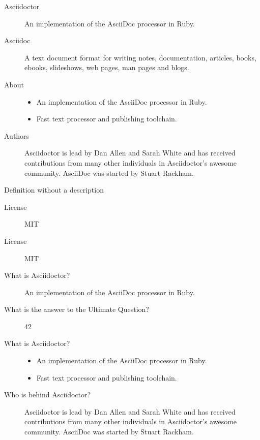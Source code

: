 \begin{description}
\item[Asciidoctor]An implementation of the AsciiDoc processor in Ruby.
\item[Asciidoc]A text document format for writing notes, documentation, articles, books,
ebooks, slideshows, web pages, man pages and blogs.
\end{description}

\begin{description}
\item[About]\begin{itemize}
\item An implementation of the AsciiDoc processor in Ruby.
\item Fast text processor and publishing toolchain.
\end{itemize}
\item[Authors]Asciidoctor is lead by Dan Allen and Sarah White and has received contributions
from many other individuals in Asciidoctor’s awesome community.
AsciiDoc was started by Stuart Rackham.
\end{description}

\begin{description}
\item[Definition without a description]\end{description}

\begin{description}
\item[License]MIT
\end{description}

\begin{description}
\item[License]MIT
\end{description}

\begin{description}
\item[What is Asciidoctor?]An implementation of the AsciiDoc processor in Ruby.
\item[What is the answer to the Ultimate Question?]42
\end{description}

\begin{description}
\item[What is Asciidoctor?]\begin{itemize}
\item An implementation of the AsciiDoc processor in Ruby.
\item Fast text processor and publishing toolchain.
\end{itemize}
\item[Who is behind Asciidoctor?]Asciidoctor is lead by Dan Allen and Sarah White and has received contributions
from many other individuals in Asciidoctor’s awesome community.
AsciiDoc was started by Stuart Rackham.
\end{description}

